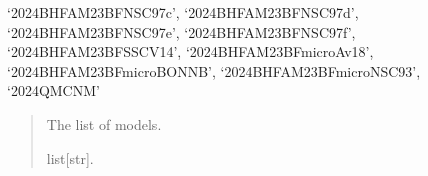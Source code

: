 \documentclass[letterpaper,10pt,english]{sphinxmanual}
\begin{document}
\begin{fulllineitems}
‘2024\sphinxhyphen{}BHF\sphinxhyphen{}AM\sphinxhyphen{}23BF\sphinxhyphen{}NSC97c’, ‘2024\sphinxhyphen{}BHF\sphinxhyphen{}AM\sphinxhyphen{}23BF\sphinxhyphen{}NSC97d’,     ‘2024\sphinxhyphen{}BHF\sphinxhyphen{}AM\sphinxhyphen{}23BF\sphinxhyphen{}NSC97e’, ‘2024\sphinxhyphen{}BHF\sphinxhyphen{}AM\sphinxhyphen{}23BF\sphinxhyphen{}NSC97f’, ‘2024\sphinxhyphen{}BHF\sphinxhyphen{}AM\sphinxhyphen{}23BF\sphinxhyphen{}SSCV14’,    ‘2024\sphinxhyphen{}BHF\sphinxhyphen{}AM\sphinxhyphen{}23BFmicro\sphinxhyphen{}Av18’, ‘2024\sphinxhyphen{}BHF\sphinxhyphen{}AM\sphinxhyphen{}23BFmicro\sphinxhyphen{}BONNB’, ‘2024\sphinxhyphen{}BHF\sphinxhyphen{}AM\sphinxhyphen{}23BFmicro\sphinxhyphen{}NSC93’,    ‘2024\sphinxhyphen{}QMC\sphinxhyphen{}NM’
\begin{quote}\begin{description}
\sphinxAtStartPar
The list of models.

\sphinxAtStartPar
list{[}str{]}.

\end{description}\end{quote}

\end{fulllineitems}


\begin{fulllineitems}
\label{\detokenize{source/api/setup_matter_micro:nucleardatapy.matter.setup_micro.micro_models_group_NM}}
\pysigstartsignatures
{}
\pysigstopsignatures
\end{fulllineitems}


\begin{fulllineitems}
\label{\detokenize{source/api/setup_matter_micro:nucleardatapy.matter.setup_micro.micro_models_group_SM}}
\pysigstartsignatures
{}
\pysigstopsignatures
\end{fulllineitems}
\end{document}
